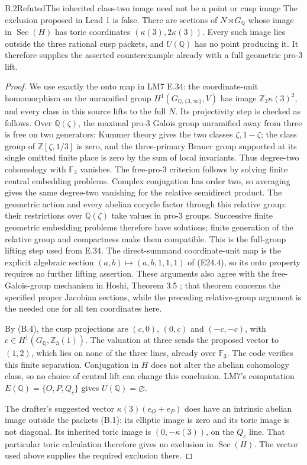 \begin{statement}{B.2}{Refuted}{The inherited class-two image need not be a point or cusp image}
The exclusion proposed in Lead 1 is false.  There are sections of
$N\rtimes G_{\mathbb Q}$ whose image in $\operatorname{Sec}(H)$
has toric coordinates $(\kappa(3),2\kappa(3))$.  Every such image
lies outside the three rational cusp packets, and $U(\mathbb Q)$
has no point producing it.  It therefore supplies the asserted
counterexample already with a full geometric pro-$3$ lift.
\end{statement}
\begin{proof}
We use exactly the onto map in LM7 E.34: the coordinate-unit
homomorphism on the unramified group
$H^1(G_{\mathbb Q,\{3,\infty\}},V)$ has image
$\mathbb Z_3\kappa(3)^2$, and every class in this source lifts to
the full $N$.  Its projectivity step is checked as follows.
Over $\mathbb Q(\zeta)$, the maximal pro-$3$ Galois group unramified
away from three is free on two generators: Kummer theory gives
the two classes $\zeta,1-\zeta$; the class group of
$\mathbb Z[\zeta,1/3]$ is zero, and the three-primary Brauer group
supported at its single omitted finite place is zero by the sum of
local invariants.  Thus degree-two cohomology with $\mathbb F_3$
vanishes.  The free-pro-$3$ criterion follows by solving finite
central embedding problems.  Complex conjugation has order two,
so averaging gives the same degree-two vanishing for the relative
semidirect product.  The geometric action and every abelian cocycle
factor through this relative group: their restrictions over
$\mathbb Q(\zeta)$ take values in pro-$3$ groups.  Successive finite
geometric embedding problems therefore have solutions; finite
generation of the relative group and compactness make them
compatible.  This is the full-group lifting step used from E.34.
The direct-summand coordinate-unit map is the explicit algebraic
section $(a,b)\mapsto(a,b,1,1,1)$ of (E24.4), so its onto property
requires no further lifting assertion.  These arguments also agree
with the free-Galois-group mechanism in Hoshi, Theorem 3.5
\cite{BC_Hoshi2010}; that theorem concerns the specified proper
Jacobian sections, while the preceding relative-group argument
is the needed one for all ten coordinates here.

By (B.4), the cusp projections are $(c,0)$, $(0,c)$ and
$(-c,-c)$, with $c\in H^1(G_{\mathbb Q},\mathbb Z_3(1))$.
The valuation at three sends the proposed vector to $(1,2)$,
which lies on none of the three lines, already over $\mathbb F_3$.
The code verifies this finite separation.  Conjugation in $H$
does not alter the abelian cohomology class, so no choice of
central lift can change this conclusion.  LM7's computation
$E(\mathbb Q)=\{O,P,Q_c\}$ gives $U(\mathbb Q)=\varnothing$.

The drafter's suggested vector
$\kappa(3)(e_O+e_P)$ does have an intrinsic abelian image outside
the packets (B.1): its elliptic image is zero and its toric image
is not diagonal.  Its inherited toric image is
$(0,-\kappa(3))$, on the $Q_c$ line.  That particular toric
calculation therefore gives no exclusion in $\operatorname{Sec}(H)$.
The vector used above supplies the required exclusion there.
\end{proof}

